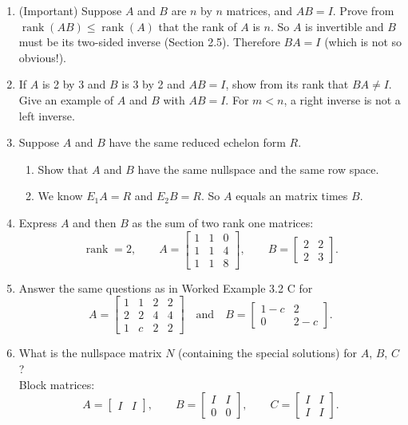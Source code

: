 \documentclass[14pt, a4paper]{article}
\begin{document}
\begin{enumerate}[resume]
    \item (Important) Suppose $A$ and $B$ are $n$ by $n$ matrices, and $AB = I$. Prove from $\operatorname{rank}(AB) \le \operatorname{rank}(A)$ that the rank of $A$ is $n$. So $A$ is invertible and $B$ must be its two-sided inverse (Section 2.5). Therefore $BA = I$ (which is not so obvious!).

    \item If $A$ is 2 by 3 and $B$ is 3 by 2 and $AB = I$, show from its rank that $BA \ne I$. Give an example of $A$ and $B$ with $AB = I$. For $m < n$, a right inverse is not a left inverse.

    \item Suppose $A$ and $B$ have the same reduced echelon form $R$.
          \begin{enumerate}
              \item Show that $A$ and $B$ have the same nullspace and the same row space.
              \item We know $E_1 A = R$ and $E_2 B = R$. So $A$ equals an \underline{\hspace{2cm}} matrix times $B$.
          \end{enumerate}

    \item Express $A$ and then $B$ as the sum of two rank one matrices:
          \[
              \operatorname{rank} = 2, \qquad
              A = \begin{bmatrix} 1 & 1 & 0 \\ 1 & 1 & 4 \\ 1 & 1 & 8 \end{bmatrix}, \qquad
              B = \begin{bmatrix} 2 & 2 \\ 2 & 3 \end{bmatrix}.
          \]

    \item Answer the same questions as in Worked Example 3.2 C for
          \[
              A = \begin{bmatrix} 1 & 1 & 2 & 2 \\ 2 & 2 & 4 & 4 \\ 1 & c & 2 & 2 \end{bmatrix} \quad \text{and} \quad
              B = \begin{bmatrix} 1-c & 2 \\ 0 & 2-c \end{bmatrix}.
          \]

    \item What is the nullspace matrix $N$ (containing the special solutions) for $A$, $B$, $C$? \\
          Block matrices:
          \[
              A = \begin{bmatrix} I & I \end{bmatrix}, \qquad
              B = \begin{bmatrix} I & I \\ 0 & 0 \end{bmatrix}, \qquad
              C = \begin{bmatrix} I & I \\ I & I \end{bmatrix}.
          \]


\end{enumerate}
\end{document}

